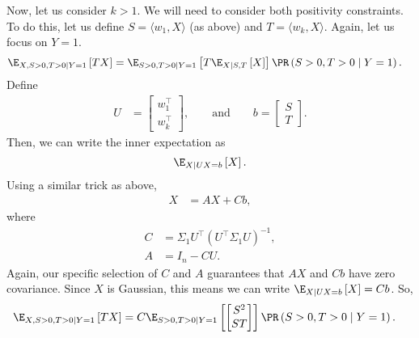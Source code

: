 \documentclass{article}
\begin{document}
Now, let us consider $k>1$.
We will need to consider both positivity constraints.
To do this, let us define $S = \langle w_1, X \rangle$ (as above) and $T = \langle w_k, X \rangle$.
Again, let us focus on $Y = 1$.
\begin{align}
  \E_{X, S > 0, T > 0 \mid Y=1} \left[ T X \right]
  &= \E_{S > 0, T > 0 \mid Y=1} \left[ T \E_{X \mid S, T} \left[ X \right] \right] \PR\left( S>0, T>0 \mid Y=1 \right).
\end{align}
Define
\begin{align}
  U &= \begin{bmatrix} w_1^\top \\ w_k^\top \end{bmatrix}, \qquad \text{and} \qquad
  b = \begin{bmatrix} S \\ T \end{bmatrix}.
\end{align}
Then, we can write the inner expectation as
\begin{align}
  \E_{X \mid U X = b} \left[ X \right].
\end{align}
Using a similar trick as above,
\begin{align}
  X &= AX + C b, \label{eq:X_rewrite_wk}
\end{align}
where
\begin{align}
  C &= \Sigma_1 U^\top ( U^\top \Sigma_1 U )^{-1}, \\
  A &= I_n - C U.
\end{align}
Again, our specific selection of $C$ and $A$ guarantees that $A X$ and $C b$ have zero covariance.
Since $X$ is Gaussian, this means we can write $\E_{X \mid U X = b} \left[ X \right] = C b$.
So,
\begin{align}
  \E_{X, S > 0, T > 0 \mid Y=1} \left[ T X \right]
  &= C \E_{S > 0, T > 0 \mid Y=1} \left[ \begin{bmatrix} S^2 \\ ST \end{bmatrix} \right] \PR\left( S>0, T>0 \mid Y=1 \right).
\end{align}
\end{document}
